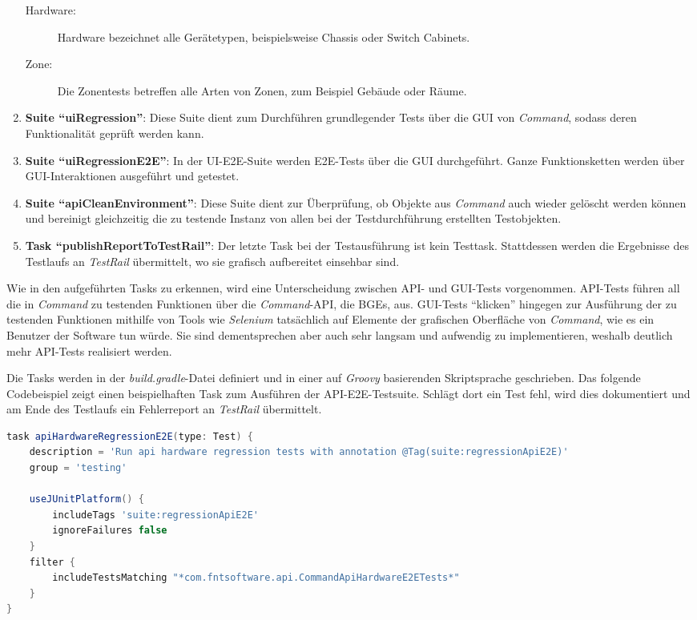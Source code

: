 \begin{enumerate}
\begin{description}
        \item[Hardware:] Hardware bezeichnet alle Gerätetypen, beispielsweise Chassis oder Switch Cabinets.
        \item[Zone:] Die Zonentests betreffen alle Arten von Zonen, zum Beispiel Gebäude oder Räume.
    \end{description}
    \item \textbf{Suite \enquote{uiRegression}}: Diese Suite dient zum Durchführen grundlegender Tests über die \ac{GUI} von \textit{Command}, sodass deren Funktionalität geprüft werden kann.
    \item \textbf{Suite \enquote{uiRegressionE2E}}: In der UI-E2E-Suite werden \ac{E2E}-Tests über die \ac{GUI} durchgeführt. Ganze Funktionsketten werden über \ac{GUI}-Interaktionen ausgeführt und getestet.
    \item \textbf{Suite \enquote{apiCleanEnvironment}}: Diese Suite dient zur Überprüfung, ob Objekte aus \textit{Command} auch wieder gelöscht werden können und bereinigt gleichzeitig die zu testende Instanz von allen bei der Testdurchführung erstellten Testobjekten.
    \item \textbf{Task \enquote{publishReportToTestRail}}: Der letzte Task bei der Testausführung ist kein Testtask. Stattdessen werden die Ergebnisse des Testlaufs an \textit{TestRail} übermittelt, wo sie grafisch aufbereitet einsehbar sind.
\end{enumerate}

Wie in den aufgeführten Tasks zu erkennen, wird eine Unterscheidung zwischen \ac{API}- und \ac{GUI}-Tests vorgenommen. \ac{API}-Tests führen all die in \textit{Command} zu testenden Funktionen über die \textit{Command}-\ac{API}, die \ac{BGE}s, aus. \ac{GUI}-Tests \enquote{klicken} hingegen zur Ausführung der zu testenden Funktionen mithilfe von Tools wie \textit{Selenium} tatsächlich auf Elemente der grafischen Oberfläche von \textit{Command}, wie es ein Benutzer der Software tun würde. Sie sind dementsprechen aber auch sehr langsam und aufwendig zu implementieren, weshalb deutlich mehr \ac{API}-Tests realisiert werden.

Die Tasks werden in der \textit{build.gradle}-Datei definiert und in einer auf \textit{Groovy} basierenden Skriptsprache geschrieben. Das folgende Codebeispiel zeigt einen beispielhaften Task zum Ausführen der \ac{API}-\ac{E2E}-Testsuite. Schlägt dort ein Test fehl, wird dies dokumentiert und am Ende des Testlaufs ein Fehlerreport an \textit{TestRail} übermittelt.

\begin{lstlisting}[caption=Ein Beispiel eines Gradle Tasks zum Ausführen einer Testsuite, label=Gradle-Task-Code, language=Groovy]
task apiHardwareRegressionE2E(type: Test) {
    description = 'Run api hardware regression tests with annotation @Tag(suite:regressionApiE2E)'
    group = 'testing'
    
    useJUnitPlatform() {
        includeTags 'suite:regressionApiE2E'
        ignoreFailures false
    }
    filter {
        includeTestsMatching "*com.fntsoftware.api.CommandApiHardwareE2ETests*"
    }
}
\end{lstlisting}

